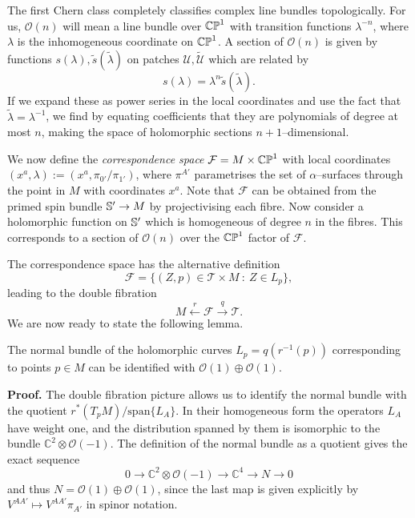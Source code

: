 The first Chern class completely classifies complex line bundles topologically. For us, $\mathcal{O}(n)$ will mean a line bundle over $\mathbb{CP}^1$ with transition functions $\lambda^{-n}$, where $\lambda$ is the inhomogeneous coordinate on $\mathbb{CP}^1$. A section of $\mathcal{O}(n)$ is given by functions $s(\lambda),\tilde{s}(\tilde{\lambda})$ on patches $\mathcal{U},\tilde{\mathcal{U}}$ which are related by
\[
s(\lambda)=\lambda^n\tilde{s}(\tilde{\lambda}).
\]
If we expand these as power series in the local coordinates and use the fact that $\tilde{\lambda}=\lambda^{-1}$, we find by equating coefficients that they are polynomials of degree at most $n$, making the space of holomorphic sections $n+1$--dimensional.

We now define the \textit{correspondence space} $\mathcal{F}=M\times\mathbb{CP}^1$ with local coordinates $(x^a,\lambda):=(x^a,\pi_{0'}/\pi_{1'})$, where $\pi^{A'}$ parametrises the set of $\alpha$--surfaces through the point in $M$ with coordinates $x^a$. Note that $\mathcal{F}$ can be obtained from the primed spin bundle $\mathbb{S}'\rightarrow M$ by projectivising each fibre. Now consider a holomorphic function on $\mathbb{S}'$ which is homogeneous of degree $n$ in the fibres. This corresponds to a section of $\mathcal{O}(n)$ over the $\mathbb{CP}^1$ factor of $\mathcal{F}$. 

The correspondence space has the alternative definition
\[
\mathcal{F}=\{(Z,p)\in \mathscr{T}\times M \ :\  Z\in L_p\},
\]
leading to the double fibration
\[
M\xleftarrow{r}\mathcal{F}\xrightarrow{q}\mathscr{T}.
\]
We are now ready to state the following lemma.

\begin{lemma}
The normal bundle of the holomorphic curves $L_p=q(r^{-1}(p))$ corresponding to points $p\in M$ can be identified with $\mathcal{O}(1)\oplus\mathcal{O}(1)$.
\end{lemma}
\noindent
{\bf Proof.} The double fibration picture allows us to identify the normal bundle with the quotient $r^*(T_pM)/\mathrm{span}\{L_A\}$. In their homogeneous form the operators $L_A$ have weight one, and the distribution spanned by them is isomorphic to the bundle $\mathbb{C}^2\otimes\mathcal{O}(-1)$. The definition of the normal bundle as a quotient gives the exact sequence
\[
0\rightarrow \mathbb{C}^2\otimes\mathcal{O}(-1)\rightarrow\mathbb{C}^4\rightarrow N\rightarrow 0
\]
and thus $N=\mathcal{O}(1)\oplus\mathcal{O}(1)$, since the last map is given explicitly by $V^{AA'}\mapsto V^{AA'}\pi_{A'}$ in spinor notation.
\koniec

